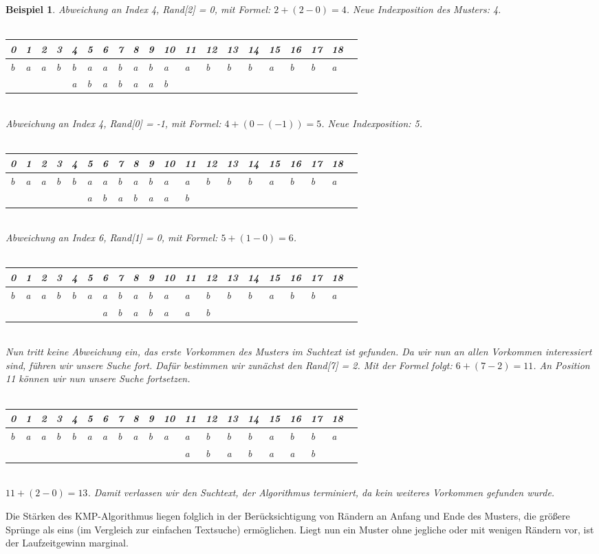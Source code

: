 \documentclass[11pt,a4paper]{scrartcl}
\newtheorem{example}{Beispiel}
\begin{document}
\begin{example}
Abweichung an Index 4, Rand[2] = 0, mit Formel: $2+(2-0) = 4$. Neue Indexposition des Musters: 4. \\\\
\begin{tabular}{|l|l|l|l|l|l|l|l|l|l|l|l|l|l|l|l|l|l|l|l|}
\hline
0&1&2&3&4&5&6&7&8&9&10&11&12&13&14&15&16&17&18 \\
\hline
b&a&a&b&b&a&a&b&a&b&a&a&b&b&b&a&b&b&a \\
\hline
 & & & &a&b&a&b&a&a&b& & & & & & & &    \\
\hline
\end{tabular}\\
Abweichung an Index 4, Rand[0] = -1, mit Formel: $4+(0-(-1)) = 5$. Neue Indexposition: 5. \\\\
\begin{tabular}{|l|l|l|l|l|l|l|l|l|l|l|l|l|l|l|l|l|l|l|l|}
\hline
0&1&2&3&4&5&6&7&8&9&10&11&12&13&14&15&16&17&18 \\
\hline
b&a&a&b&b&a&a&b&a&b&a&a&b&b&b&a&b&b&a \\
\hline
 & & & & &a&b&a&b&a&a&b& & & & & & &    \\
\hline
\end{tabular}\\
Abweichung an Index 6, Rand[1] = 0, mit Formel: $5+(1-0) = 6$. \\\\
\begin{tabular}{|l|l|l|l|l|l|l|l|l|l|l|l|l|l|l|l|l|l|l|l|}
\hline
0&1&2&3&4&5&6&7&8&9&10&11&12&13&14&15&16&17&18 \\
\hline
b&a&a&b&b&a&a&b&a&b&a&a&b&b&b&a&b&b&a \\
\hline
 & & & & & &a&b&a&b&a&a&b& & & & & &    \\
\hline
\end{tabular}\\
Nun tritt keine Abweichung ein, das erste Vorkommen des Musters im Suchtext ist gefunden. Da wir nun an allen Vorkommen interessiert sind, führen wir unsere Suche fort. Dafür bestimmen wir zunächst den Rand[7] = 2. Mit der Formel folgt: $6+(7-2) = 11$. An Position 11 können wir nun unsere Suche fortsetzen.\\\\
\begin{tabular}{|l|l|l|l|l|l|l|l|l|l|l|l|l|l|l|l|l|l|l|l|}
\hline
0&1&2&3&4&5&6&7&8&9&10&11&12&13&14&15&16&17&18 \\
\hline
b&a&a&b&b&a&a&b&a&b&a&a&b&b&b&a&b&b&a \\
\hline
 & & & & & & & & & & &a&b&a&b&a&a&b&    \\
\hline
\end{tabular}\\
$11+(2-0) = 13$. Damit verlassen wir den Suchtext, der Algorithmus terminiert, da kein weiteres Vorkommen gefunden wurde.
\end{example}
Die Stärken des KMP-Algorithmus liegen folglich in der Berücksichtigung von Rändern an Anfang und Ende des Musters, die größere Sprünge als eins (im Vergleich zur einfachen Textsuche) ermöglichen. Liegt nun ein Muster ohne jegliche oder mit wenigen Rändern vor, ist der Laufzeitgewinn marginal.
\end{document}
